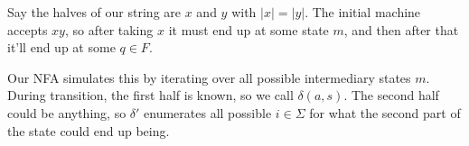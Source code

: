 \documentclass[12pt]{article}
\begin{document}
Say the halves of our string are $x$ and $y$ with $|x|=|y|$.
The initial machine accepts $xy$, so after taking $x$ it must end
up at some state $m$, and then after that it'll end up at some $q \in F$.

Our NFA simulates this by iterating over all possible intermediary states $m$.
During transition, the first half is known, so we call $\delta(a, s)$.
The second half could be anything, so $\delta'$ enumerates all possible $i \in \Sigma$
for what the second part of the state could end up being.
\end{document}
